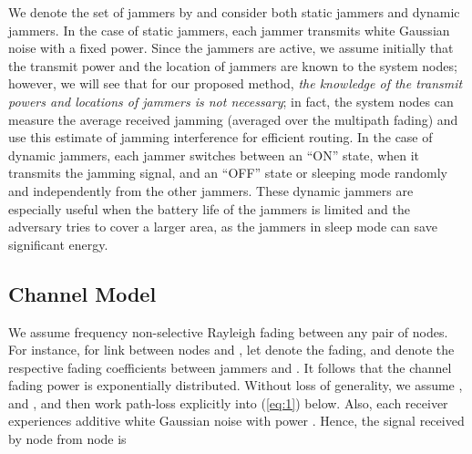 \documentclass[10pt,journal]{IEEEtran}
\theoremstyle{definition}
\begin{document}
We denote the set of jammers  by  and consider both static jammers and dynamic jammers. 
In the case of static jammers,  each jammer transmits white Gaussian noise with a fixed power.  
Since the jammers are active, we assume initially that the transmit power and the location of jammers are known to the system nodes; 
however, we will see that for our proposed method, \textit{the knowledge of the transmit powers and locations of jammers is not necessary};
 in fact, the system nodes can measure the average received jamming (averaged over the multipath fading)  and use this estimate of jamming interference for efficient routing. 
In the case of dynamic jammers, each jammer switches between an ``ON'' state, when it transmits the jamming signal,  and an ``OFF'' state or sleeping mode randomly and independently from the other jammers. 
These dynamic jammers are especially useful when the battery life of the jammers is limited and the adversary tries to cover a larger area, as the jammers in  sleep mode can save significant energy.
\subsection{Channel Model}
We assume frequency non-selective Rayleigh fading between any  pair of nodes. 
 For instance, for link  between nodes  and , let  denote the  fading,  and  denote the respective fading coefficients  between jammers and  . 
It follows that the channel fading power is exponentially distributed. Without loss of generality, we assume  , and , and then work path-loss explicitly into (\ref{eq:1}) below.
Also, each receiver experiences additive white Gaussian noise with power . Hence, the signal received by node  from node  is
\end{document}
